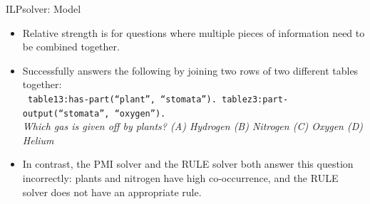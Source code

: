 \documentclass[final]{beamer}
\newlength{\onecolwid}
\newlength{\twocolwid}
\begin{document}
\begin{frame}[t]
\begin{columns}[t]
\begin{column}{\twocolwid}
\begin{columns}[t,totalwidth=\twocolwid]
\begin{column}{\onecolwid}
\begin{block}{ILPsolver: Model}
		\begin{itemize}
			\item Relative strength is for questions where multiple pieces of information need to be combined together. 
			\item Successfully answers the following by joining two rows of two different tables together: \\
			{\tt 
				table13:has-part(``plant'', ``stomata'').
				tablez3:part-output(``stomata'', ``oxygen'').
			} 
			\\
			{\small  \textit{ Which gas is given off by plants? (A) Hydrogen (B) Nitrogen (C) Oxygen (D) Helium} }
			\item In contrast, the PMI solver and the RULE solver both answer
			this question incorrectly: plants and nitrogen have high
			co-occurrence, and the RULE solver does not have an appropriate
			rule.
		\end{itemize}		
\end{block}

\end{column} %

\end{columns} %


\end{column}
\end{columns}
\end{frame}
\end{document}
